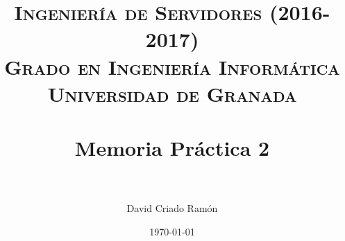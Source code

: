 



\title{	
\normalfont \normalsize 
\textsc{\textbf{Ingeniería de Servidores (2016-2017)} \\ Grado en Ingeniería Informática \\ Universidad de Granada} \\ [25pt] %
\horrule{0.5pt} \\[0.4cm] %
\huge Memoria Práctica 2 \\ %
\horrule{2pt} \\[0.5cm] %
}

\author{David Criado Ramón} %

\date{\normalsize\today} %







\maketitle %

\newpage %

\tableofcontents %

\listoffigures

\listoftables

